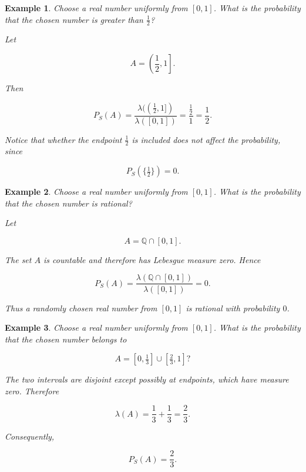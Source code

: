 \documentclass[10pt,a4paper]{book}
\newtheorem{example}{Example}[section]
\begin{document}
\begin{example}

    Choose a real number uniformly from $[0,1]$. What is the probability that the chosen number is greater than $\frac12$?

    Let

    $$
        A=\left(\frac12,1\right].
    $$

    Then

    $$
        P_S(A)
        =
        \frac{\lambda((\frac12,1])}{\lambda([0,1])}
        =
        \frac{\frac12}{1}
        =
        \frac12.
    $$

    Notice that whether the endpoint $\frac12$ is included does not affect the probability, since

    $$
        P_S(\{\tfrac12\})=0.
    $$

\end{example}

\begin{example}

    Choose a real number uniformly from $[0,1]$. What is the probability that the chosen number is rational?

    Let

    $$
        A=\mathbb Q\cap[0,1].
    $$

    The set $A$ is countable and therefore has Lebesgue measure zero. Hence

    $$
        P_S(A)
        =
        \frac{\lambda(\mathbb Q\cap[0,1])}{\lambda([0,1])}
        =
        0.
    $$

    Thus a randomly chosen real number from $[0,1]$ is rational with probability $0$.
\end{example}

\begin{example}

    Choose a real number uniformly from $[0,1]$. What is the probability that the chosen number belongs to

    $$
        A=[0,\tfrac13]\cup[\tfrac23,1]?
    $$

    The two intervals are disjoint except possibly at endpoints, which have measure zero. Therefore

    $$
        \lambda(A)
        =
        \frac13+\frac13
        =
        \frac23.
    $$

    Consequently,

    $$
        P_S(A)=\frac23.
    $$

\end{example}
\end{document}
